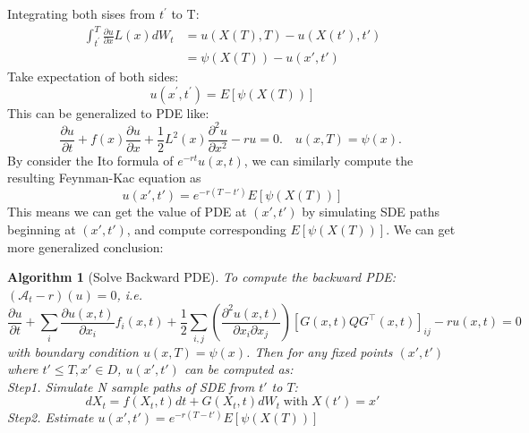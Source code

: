 \documentclass{article}
\newtheorem{algorithm}{Algorithm}
\begin{document}
Integrating both sises from $t^{\prime}$  to  T:
\begin{equation}
    \begin{aligned}
        \int_{t^{\prime}}^{T} \frac{\partial u}{\partial x} L(x) d W_{t} &= u(X(T), T) - u(X(t'), t')\\
        &= \psi(X(T)) - u(x', t')
    \end{aligned}
\end{equation}
Take expectation of both sides:
\begin{equation}
    u\left(x^{\prime}, t^{\prime}\right)=E[\psi(X(T))]
\end{equation}  
This can be generalized to PDE like:
\begin{equation}
    \frac{\partial u}{\partial t}+f(x) \frac{\partial u}{\partial x}+\frac{1}{2} L^{2}(x) \frac{\partial^{2} u}{\partial x^{2}}-r u=0 . \quad u(x, T)=\psi(x) \text {. }
\end{equation}
By consider the Ito formula of $e^{-rt}u(x, t)$, we can similarly compute the resulting Feynman-Kac equation as 
\begin{equation}
    u(x', t') = e^{-r(T-t')}E\left[\psi(X(T))\right]
\end{equation}
This means we can get the value of PDE at $(x', t')$ by simulating SDE paths beginning at $(x', t')$, and compute corresponding $E\left[\psi(X(T))\right]$. We can get more generalized conclusion:
\begin{algorithm}[Solve Backward PDE]

    To compute the backward PDE: $(\mathcal{A}_t-r)(u)=0$, i.e.
    \begin{equation}
        \frac{\partial u}{\partial t} + \sum_{i} \frac{\partial u(x, t)}{\partial x_{i}} f_{i}(x, t)+\frac{1}{2} \sum_{i, j}\left(\frac{\partial^{2}u(x, t)}{\partial x_{i} \partial x_{j}}\right)\left[G(x, t)Q G^{\top}(x, t)\right]_{i j} - ru(x, t)=0
    \end{equation}
    with boundary condition $u(x, T)=\psi(x)$. Then for any fixed points $(x', t')$ where $t'\leq T, x'\in D$, $u(x', t')$ can be computed as:\\
    Step1. Simulate N sample paths of SDE from $t'$ to $T$:
    \begin{equation}
        dX_t=f(X_t, t)dt + G(X_t, t)dW_t\operatorname{with}X(t')=x'
    \end{equation}
    Step2. Estimate $u(x', t') = e^{-r(T-t')}E\left[\psi(X(T))\right]$
\end{algorithm}
\end{document}
